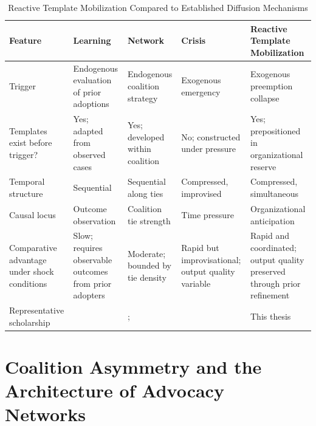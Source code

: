 \begin{landscape}
\begin{table}
\centering
\caption{Reactive Template Mobilization Compared to Established Diffusion Mechanisms}
\label{tab:rtm-comparison}
\renewcommand{\arraystretch}{1.3}
\setlength{\tabcolsep}{8pt}
\small
\begin{tabular}{@{}>{\raggedright\arraybackslash}p{3.2cm} >{\raggedright\arraybackslash}p{4.2cm} >{\raggedright\arraybackslash}p{4.2cm} >{\raggedright\arraybackslash}p{4.2cm} >{\raggedright\arraybackslash}p{4.6cm}@{}}
\toprule
\textbf{Feature} & \textbf{Learning} & \textbf{Network} & \textbf{Crisis} & \textbf{Reactive Template Mobilization} \\
\midrule
Trigger & Endogenous evaluation of prior adoptions & Endogenous coalition strategy & Exogenous emergency & Exogenous preemption collapse \\
\addlinespace
Templates exist before trigger? & Yes; adapted from observed cases & Yes; developed within coalition & No; constructed under pressure & Yes; prepositioned in organizational reserve \\
\addlinespace
Temporal structure & Sequential & Sequential along ties & Compressed, improvised & Compressed, simultaneous \\
\addlinespace
Causal locus & Outcome observation & Coalition tie strength & Time pressure & Organizational anticipation \\
\addlinespace
Comparative advantage under shock conditions & Slow; requires observable outcomes from prior adopters & Moderate; bounded by tie density & Rapid but improvisational; output quality variable & Rapid and coordinated; output quality preserved through prior refinement \\
\addlinespace
Representative scholarship & \textcite{shipanMechanismsPolicyDiffusion2008a} & \textcite{ballaInterstateProfessionalAssociations2001}; \textcite{sabatier_weible_2007} & \textcite{bousheyPolicyDiffusionDynamics2010a} & This thesis \\
\bottomrule
\end{tabular}
\end{table}
\end{landscape}

\section{Coalition Asymmetry and the Architecture of Advocacy Networks}
\label{sec:asymmetry}

